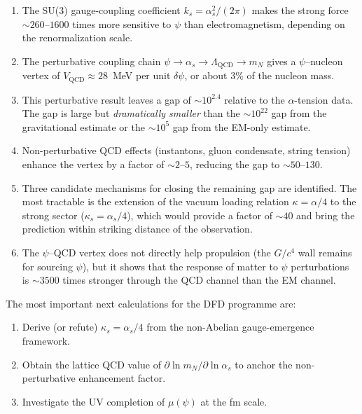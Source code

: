 \documentclass[aps,prd,twocolumn,superscriptaddress,floatfix,nofootinbib]{revtex4-2}
\newcommand{\mufunction}{\mu}
\newcommand{\kap}{\kappa}
\newcommand{\LQCD}{\Lambda_{\mathrm{QCD}}}
\newcommand{\as}{\alpha_s}
\newcommand{\mN}{m_N}
\newcommand{\ks}{k_s}
\newcommand{\dpsi}{\delta\psi}
\newcommand{\alphafine}{\alpha}
\begin{document}
\begin{enumerate}
\item The SU(3) gauge-coupling coefficient $\ks = \as^2/(2\pi)$ makes the
strong force $\sim 260$--$1600$ times more sensitive to $\psi$ than
electromagnetism, depending on the renormalization scale.

\item The perturbative coupling chain $\psi \to \as \to \LQCD \to \mN$ gives
a $\psi$--nucleon vertex of $V_{\mathrm{QCD}} \approx 28$~MeV per unit
$\dpsi$, or about $3\%$ of the nucleon mass.

\item This perturbative result leaves a gap of $\sim 10^{2.4}$ relative to
the $\alpha$-tension data. The gap is large but \emph{dramatically smaller}
than the $\sim 10^{22}$ gap from the gravitational estimate or the
$\sim 10^{5}$ gap from the EM-only estimate.

\item Non-perturbative QCD effects (instantons, gluon condensate, string
tension) enhance the vertex by a factor of $\sim 2$--$5$, reducing the gap
to $\sim 50$--$130$.

\item Three candidate mechanisms for closing the remaining gap are identified.
The most tractable is the extension of the vacuum loading relation
$\kap = \alphafine/4$ to the strong sector ($\kap_s = \as/4$), which would
provide a factor of $\sim 40$ and bring the prediction within striking
distance of the observation.

\item The $\psi$--QCD vertex does not directly help propulsion (the $G/c^4$
wall remains for sourcing $\psi$), but it shows that the response of matter
to $\psi$ perturbations is $\sim 3500$ times stronger through the QCD channel
than the EM channel.
\end{enumerate}

The most important next calculations for the DFD programme are:
\begin{enumerate}
\item Derive (or refute) $\kap_s = \as/4$ from the non-Abelian gauge-emergence
framework.
\item Obtain the lattice QCD value of $\partial\ln\mN/\partial\ln\as$ to
anchor the non-perturbative enhancement factor.
\item Investigate the UV completion of $\mufunction(\psi)$ at the fm scale.
\end{enumerate}
\end{document}
